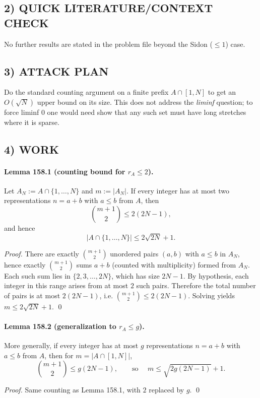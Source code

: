 \subsection*{2) QUICK LITERATURE/CONTEXT CHECK}
No further results are stated in the problem file beyond the Sidon ($\le 1$) case.

\subsection*{3) ATTACK PLAN}
Do the standard counting argument on a finite prefix $A\cap[1,N]$ to get an $O(\sqrt N)$ upper bound on its size.
This does not address the \emph{liminf} question; to force liminf $0$ one would need show that any such set must have long stretches where it is sparse.

\subsection*{4) WORK}
\paragraph{Lemma 158.1 (counting bound for $r_A\le 2$).}
Let $A_N:=A\cap\{1,\dots,N\}$ and $m:=|A_N|$. If every integer has at most two representations $n=a+b$ with $a\le b$ from $A$, then
\[
\binom{m+1}{2}\le 2(2N-1),
\]
and hence
\[
|A\cap\{1,\dots,N\}|\le 2\sqrt{2N}+1.
\]

\textit{Proof.}
There are exactly $\binom{m+1}{2}$ unordered pairs $(a,b)$ with $a\le b$ in $A_N$, hence exactly $\binom{m+1}{2}$ sums $a+b$ (counted with multiplicity) formed from $A_N$.
Each such sum lies in $\{2,3,\dots,2N\}$, which has size $2N-1$. By hypothesis, each integer in this range arises from at most $2$ such pairs.
Therefore the total number of pairs is at most $2(2N-1)$, i.e. $\binom{m+1}{2}\le 2(2N-1)$.
Solving yields $m\le 2\sqrt{2N}+1$. \qed

\paragraph{Lemma 158.2 (generalization to $r_A\le g$).}
More generally, if every integer has at most $g$ representations $n=a+b$ with $a\le b$ from $A$, then for $m=|A\cap[1,N]|$,
\[
\binom{m+1}{2}\le g(2N-1),
\qquad\text{so }\quad m\le \sqrt{2g(2N-1)}+1.
\]

\textit{Proof.}
Same counting as Lemma 158.1, with $2$ replaced by $g$. \qed


